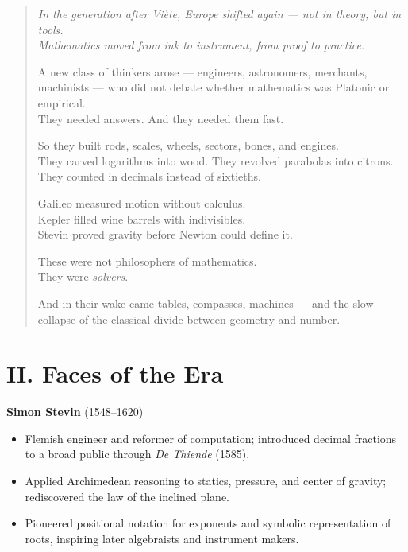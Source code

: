 \documentclass[9pt]{article}
\begin{document}
\begin{quote}
\itshape
In the generation after Viète, Europe shifted again — not in theory, but in tools.\\
Mathematics moved from ink to instrument, from proof to practice.

A new class of thinkers arose — engineers, astronomers, merchants, machinists — who did not debate whether mathematics was Platonic or empirical.\\
They needed answers. And they needed them fast.

So they built rods, scales, wheels, sectors, bones, and engines.\\
They carved logarithms into wood. They revolved parabolas into citrons. They counted in decimals instead of sixtieths.

Galileo measured motion without calculus.\\
Kepler filled wine barrels with indivisibles.\\
Stevin proved gravity before Newton could define it.

These were not philosophers of mathematics.\\
They were \textit{solvers}.

And in their wake came tables, compasses, machines — and the slow collapse of the classical divide between geometry and number.
\end{quote}



\newpage



\section*{II. Faces of the Era}

\textbf{Simon Stevin} (1548–1620)

\begin{itemize}
    \item Flemish engineer and reformer of computation; introduced decimal fractions to a broad public through \textit{De Thiende} (1585).
    \item Applied Archimedean reasoning to statics, pressure, and center of gravity; rediscovered the law of the inclined plane.
    \item Pioneered positional notation for exponents and symbolic representation of roots, inspiring later algebraists and instrument makers.
\end{itemize}
\end{document}
